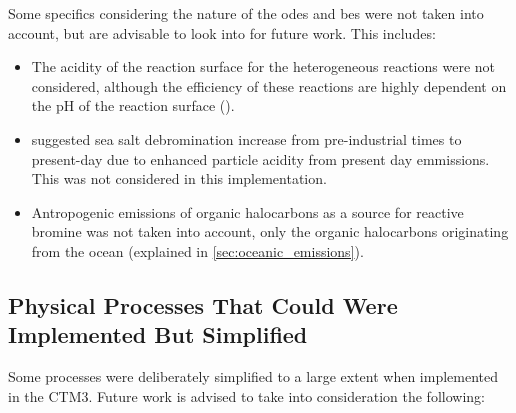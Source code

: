 Some specifics considering the nature of the \acrshort{ode}s and \acrlong{be}s were not taken into account, but are advisable to look into for future work. This includes: 
\begin{itemize}
    \item The acidity of the reaction surface for the heterogeneous reactions were not considered, although the efficiency of these reactions are highly dependent on the pH of the reaction surface (\cite{KerriAPratt2013}).
    \item \cite{Parella} suggested sea salt debromination increase from pre-industrial times to present-day due to enhanced particle acidity from present day emmissions. This was not considered in this implementation.
    \item Antropogenic emissions of organic halocarbons as a source for reactive bromine was not taken into account, only the organic halocarbons originating from the ocean (explained in \ref{sec:oceanic_emissions}).  
\end{itemize}

\subsection{Physical Processes That Could Were Implemented But Simplified}

Some processes were deliberately simplified to a large extent when implemented in the CTM3. Future work is advised to take into consideration the following: 


